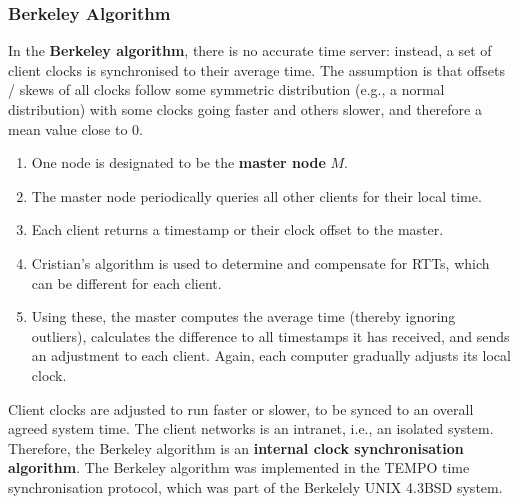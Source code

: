 \documentclass[a4paper,11pt]{article}
\begin{document}
\subsubsection{Berkeley Algorithm}
In the \textbf{Berkeley algorithm}, there is no accurate time server: instead, a set of client clocks is synchronised to their average time.
The assumption is that offsets / skews of all clocks follow some symmetric distribution (e.g., a normal distribution) with some clocks going faster and others slower, and therefore a mean value close to 0.
\begin{enumerate}
    \item   One node is designated to be the \textbf{master node} $M$.
    \item   The master node periodically queries all other clients for their local time.
    \item   Each client returns a timestamp or their clock offset to the master.
    \item   Cristian's algorithm is used to determine and compensate for RTTs, which can be different for each client.
    \item   Using these, the master computes the average time (thereby ignoring outliers), calculates the difference to all timestamps it has received, and sends an adjustment to each client.
            Again, each computer gradually adjusts its local clock.
\end{enumerate}

Client clocks are adjusted to run faster or slower, to be synced to an overall agreed system time.
The client networks is an intranet, i.e., an isolated system.
Therefore, the Berkeley algorithm is an \textbf{internal clock synchronisation algorithm}.
The Berkeley algorithm was implemented in the TEMPO time synchronisation protocol, which was part of the Berkelely UNIX 4.3BSD system.
\end{document}
